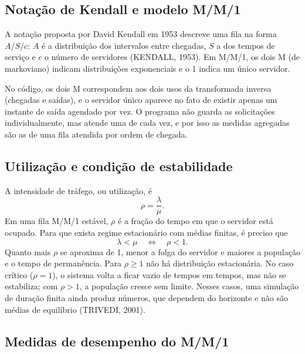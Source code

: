 \documentclass[
  article,      %
  10pt,         %
  oneside,
  a4paper,
  twocolumn,    %
  english,
  brazil        %
]{abntex2}
\begin{document}
\subsection{Notação de Kendall e modelo M/M/1}

A notação proposta por David Kendall em 1953 descreve uma fila na forma $A/S/c$: $A$ é a distribuição dos intervalos entre chegadas, $S$ a dos tempos de serviço e $c$ o número de servidores (KENDALL, 1953). Em M/M/1, os dois M (de markoviano) indicam distribuições exponenciais e o 1 indica um único servidor.

No código, os dois M correspondem aos dois usos da transformada inversa (chegadas e saídas), e o servidor único aparece no fato de existir apenas um instante de saída agendado por vez. O programa não guarda as solicitações individualmente, mas atende uma de cada vez, e por isso as medidas agregadas são as de uma fila atendida por ordem de chegada.

\subsection{Utilização e condição de estabilidade}

A intensidade de tráfego, ou utilização, é
\begin{equation}
  \rho=\frac{\lambda}{\mu}.
  \label{eq:rho}
\end{equation}
Em uma fila M/M/1 estável, $\rho$ é a fração do tempo em que o servidor está ocupado. Para que exista regime estacionário com médias finitas, é preciso que
\begin{equation}
  \lambda<\mu \quad\Longleftrightarrow\quad \rho<1.
  \label{eq:estabilidade}
\end{equation}
Quanto mais $\rho$ se aproxima de 1, menor a folga do servidor e maiores a população e o tempo de permanência. Para $\rho\geq1$ não há distribuição estacionária. No caso crítico ($\rho=1$), o sistema volta a ficar vazio de tempos em tempos, mas não se estabiliza; com $\rho>1$, a população cresce sem limite. Nesses casos, uma simulação de duração finita ainda produz números, que dependem do horizonte e não são médias de equilíbrio (TRIVEDI, 2001).

\subsection{Medidas de desempenho do M/M/1}
\end{document}
